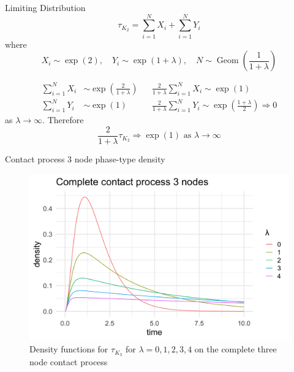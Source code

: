 \documentclass{beamer}
\theoremstyle{definition}
\begin{document}
\begin{frame}{Limiting Distribution}
$$
\tau_{K_2} = \sum_{i = 1}^N X_i +  \sum_{i = 1}^N  Y_i
$$
where
$$
X_i \sim \exp(2),\quad Y_i \sim \exp(1 + \lambda),\quad N \sim \operatorname{Geom}\left(\frac{1}{1 + \lambda}\right)
$$

\begin{align*}
    \sum_{i = 1}^N X_i &\sim \exp\left( \frac{2}{1 + \lambda} \right) && \frac{2}{1 + \lambda}\sum_{i = 1}^N X_i \sim \exp( 1 ) \\
    \sum_{i = 1}^N Y_i &\sim \exp( 1 ) &&\frac{2}{1 + \lambda}\sum_{i = 1}^N Y_i \sim \exp \left( \frac{1 + \lambda}{2} \right) \Rightarrow 0
\end{align*}
as $\lambda \to \infty$. Therefore
$$
\frac{2}{1 + \lambda} \tau_{K_2} \Rightarrow \exp(1) \text{ as } \lambda \to \infty
$$

\end{frame}

\begin{frame}{Contact process 3 node phase-type density}
\begin{figure}[H]
  \centering
    \includegraphics[width=.80\textwidth]{figures/complete_3_contact_phase_densities.png}
   \caption{Density functions for $\tau_{K_3}$ for $\lambda = 0, 1, 2, 3, 4$ on the complete three node contact process}
  \label{fig:contact_3_phase_densities}
\end{figure}
\end{frame}
\end{document}
